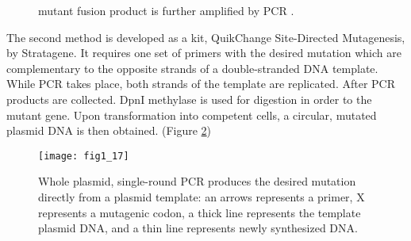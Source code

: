 \begin{refsection}
\begin{figure}[h!]
{            mutant fusion product is further amplified by PCR \cite{Ho1989}.}
            \label{fig:sdm-1} 
\end{figure}
The second method is developed as a kit, QuikChange Site-Directed Mutagenesis,
by Stratagene\cite{Arnold2003}. It requires one set of primers with the desired
mutation which are complementary to the opposite strands of a double-stranded
DNA template. While PCR takes place, both strands of the template are
replicated. After PCR products are collected. DpnI methylase is used for
digestion in order to the mutant gene.  Upon transformation into competent
cells, a circular, mutated plasmid DNA is then obtained\cite{Antikainen2005a}.
(Figure \ref{fig:sdm-2})
\begin{figure}[h!] \centering \texttt{[image: fig1\_17]}
    \caption[Whole plasmid, single-round PCR produces the desired mutation
    directly from a plasmid template: an arrows represents a primer, X
    represents a mutagenic codon, a thick line represents the template plasmid
    DNA, and a thin line represents newly synthesized DNA.]{Whole plasmid,
        single-round PCR produces the desired mutation directly from a plasmid
        template: an arrows represents a primer, X represents a mutagenic
        codon, a thick line represents the template plasmid DNA, and a thin
        line represents newly synthesized DNA\cite{Antikainen2005a}.}
        \label{fig:sdm-2}
\end{figure}


\end{refsection}
